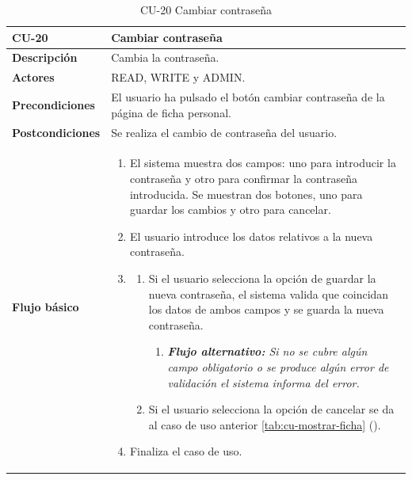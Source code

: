 \begin{table} [H]
    \centering
    \setlength{\leftmargini}{0.4cm}
	\resizebox{14cm}{!} { %
    \begin{tabular}{| m{3cm} | m{11cm} |}   
    \hline
	  \textbf{CU-20} & \textbf{Cambiar contraseña} \\\hline
	  \textbf{Descripción} & Cambia la contraseña. \\\hline
	  \textbf{Actores} & READ, WRITE y ADMIN. \\\hline
	  \textbf{Precondiciones} & El usuario ha pulsado el botón cambiar contraseña de la página de ficha personal. \\\hline
	  \textbf{Postcondiciones} & Se realiza el cambio de contraseña del usuario. \\\hline
	  \textbf{Flujo básico} & 
		\begin{enumerate}
	  	\item El sistema muestra dos campos: uno para introducir la contraseña y otro para confirmar la contraseña introducida. Se muestran dos botones, uno para guardar los cambios y otro para cancelar.
	  	\item El usuario introduce los datos relativos a la nueva contraseña.
		\item 
		\begin{enumerate}		
			\item Si el usuario selecciona la opción de guardar la nueva contraseña, el sistema valida que coincidan los datos de ambos campos y se guarda la nueva contraseña.
			\begin{enumerate}	
			   \item \textit{\textbf{Flujo alternativo:} Si no se cubre algún campo obligatorio o se produce algún error de validación el sistema informa del error.}		   
			\end{enumerate}
			\item Si el usuario selecciona la opción de cancelar se da al caso de uso anterior \ref{tab:cu-mostrar-ficha} (\pageref{tab:cu-mostrar-ficha}).
		\end{enumerate}
	   	\item Finaliza el caso de uso.
	  \end{enumerate} 	  	  
	  \\\hline
    \end{tabular}
    } %
    \caption{CU-20 Cambiar contraseña}
    \label{tab:cu-cambiar-contrasenha}
\end{table}



